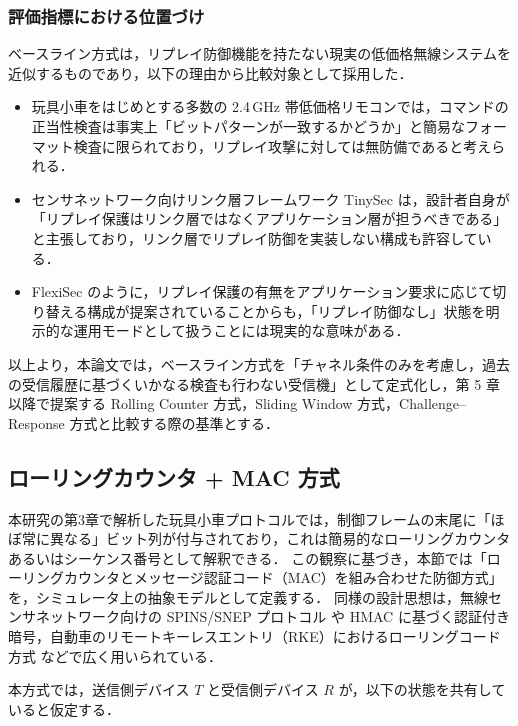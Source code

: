 \documentclass[twocolumn,10pt,a4paper]{jsarticle}
\begin{document}
\subsubsection{評価指標における位置づけ}

ベースライン方式は，リプレイ防御機能を持たない現実の低価格無線システムを近似するものであり，以下の理由から比較対象として採用した．

\begin{itemize}
  \item 玩具小車をはじめとする多数の 2.4\,GHz 帯低価格リモコンでは，コマンドの正当性検査は事実上「ビットパターンが一致するかどうか」と簡易なフォーマット検査に限られており，リプレイ攻撃に対しては無防備であると考えられる．
  \item センサネットワーク向けリンク層フレームワーク TinySec \cite{TinySec} は，設計者自身が「リプレイ保護はリンク層ではなくアプリケーション層が担うべきである」と主張しており，リンク層でリプレイ防御を実装しない構成も許容している．
  \item FlexiSec \cite{JinwalaFlexiSec} のように，リプレイ保護の有無をアプリケーション要求に応じて切り替える構成が提案されていることからも，「リプレイ防御なし」状態を明示的な運用モードとして扱うことには現実的な意味がある．
\end{itemize}

以上より，本論文では，ベースライン方式を「チャネル条件のみを考慮し，過去の受信履歴に基づくいかなる検査も行わない受信機」として定式化し，第 5 章以降で提案する Rolling Counter 方式，Sliding Window 方式，Challenge--Response 方式と比較する際の基準とする．

\subsection{ローリングカウンタ + MAC 方式}

本研究の第3章で解析した玩具小車プロトコルでは，制御フレームの末尾に「ほぼ常に異なる」ビット列が付与されており，これは簡易的なローリングカウンタあるいはシーケンス番号として解釈できる．
この観察に基づき，本節では「ローリングカウンタとメッセージ認証コード（MAC）を組み合わせた防御方式」を，シミュレータ上の抽象モデルとして定義する．
同様の設計思想は，無線センサネットワーク向けの SPINS/SNEP プロトコル\cite{PerrigSPINS} や HMAC に基づく認証付き暗号\cite{RFC2104HMAC}，自動車のリモートキーレスエントリ（RKE）におけるローリングコード方式\cite{Garcia2016RKE} などで広く用いられている．

本方式では，送信側デバイス $T$ と受信側デバイス $R$ が，以下の状態を共有していると仮定する．
\end{document}
